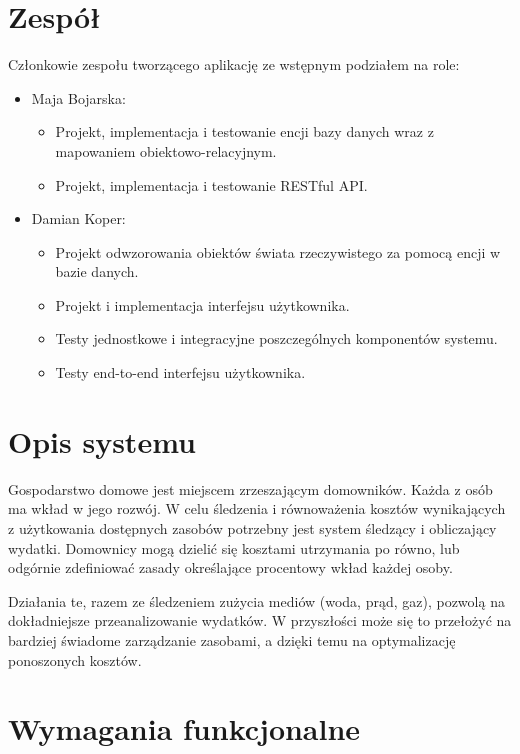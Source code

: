 \section{Zespół}
Członkowie zespołu tworzącego aplikację ze wstępnym podziałem na role:
\begin{itemize}
    \item Maja Bojarska:
        \begin{itemize}
            \item Projekt, implementacja i testowanie encji bazy danych wraz z mapowaniem obiektowo-relacyjnym.
            \item Projekt, implementacja i testowanie RESTful API.
        \end{itemize}
    \item Damian Koper:
        \begin{itemize}
            \item Projekt odwzorowania obiektów świata rzeczywistego za pomocą encji w bazie danych.
            \item Projekt i implementacja interfejsu użytkownika.
            \item Testy jednostkowe i integracyjne poszczególnych komponentów systemu.
            \item Testy end-to-end interfejsu użytkownika.
        \end{itemize}
\end{itemize}

\section{Opis systemu}
Gospodarstwo domowe jest miejscem zrzeszającym domowników. Każda z osób ma wkład w jego rozwój. W celu śledzenia i równoważenia kosztów wynikających z użytkowania dostępnych zasobów potrzebny jest system śledzący i obliczający wydatki. Domownicy mogą dzielić się kosztami utrzymania po równo, lub odgórnie zdefiniować zasady określające procentowy wkład każdej osoby.

Działania te, razem ze śledzeniem zużycia mediów (woda, prąd, gaz), pozwolą na dokładniejsze przeanalizowanie wydatków. W przyszłości może się to przełożyć na bardziej świadome zarządzanie zasobami, a dzięki temu na optymalizację ponoszonych kosztów.

\newpage

\section{Wymagania funkcjonalne}

